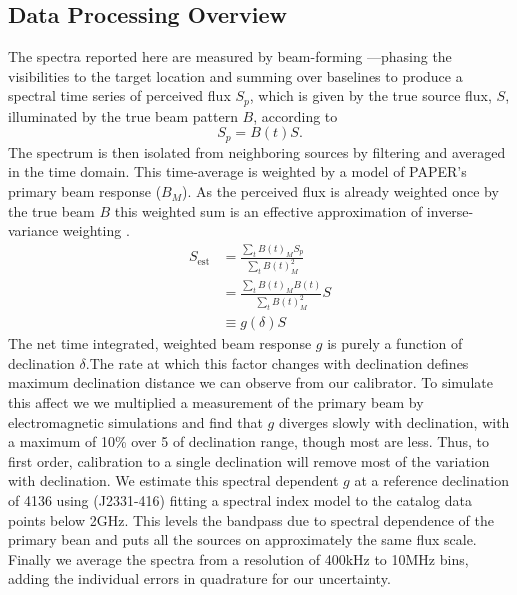 \documentclass[preprint]{aastex}
\begin{document}
\subsection{Data Processing Overview}
\label{sec:data_overview}
The spectra reported here are measured by beam-forming ---phasing the visibilities to
the target location and summing over baselines to produce a spectral time series of perceived flux $S_p$,
which is given by the true source flux, $S$, illuminated by the true beam pattern $B$, according to
\begin{equation}
S_p=B(t)S.
\end{equation}
The spectrum is then isolated
from neighboring sources by filtering and averaged in the time domain.  This time-average is 
weighted by a model of PAPER's primary beam response ($B_M$). As the perceived flux is already weighted once by the true beam $B$ this weighted sum is an effective approximation of inverse-variance weighting \citep{Pober:2012p8800}. 
\begin{align}
S_\textrm{est} &= \frac{\sum_t B(t)_M S_p}{\sum_t B(t)^2_M} \nonumber \\ 
&= \frac{\sum_t B(t)_M B(t)}{\sum_t B(t)^2_M} S  \nonumber \\
&\equiv g(\delta) S  \label{eq:g}
\end{align}
The net time integrated, weighted beam response $g$ is purely a function of declination $\delta$.The rate at which this factor
changes with declination defines maximum declination distance we can observe from our calibrator. 
To simulate this affect we we multiplied a measurement of the primary beam \citep{Pober:2012p8800}
by electromagnetic simulations \citep{Parsons:2010p6757} and find that $g$ 
diverges slowly with declination, with a maximum of 10\% over 5\arcdeg{} of declination range, though most are less. Thus, to first order,
calibration to a single declination will remove most of the variation with declination.
We estimate this spectral dependent $g$ at a reference declination of 41\arcdeg{}36\arcmin{}  using (J2331-416) fitting a spectral index model to the
 catalog data points below 2GHz. This levels the bandpass due to spectral dependence  of the primary bean 
 and puts all the sources on approximately the same flux scale.  
 Finally we average the spectra from a resolution of 400kHz to 10MHz bins, adding the individual errors in quadrature
 for our uncertainty.
 
\end{document}
